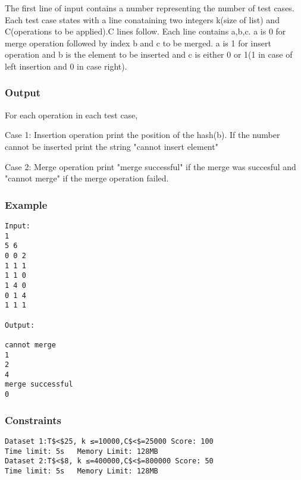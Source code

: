    The first line of input contains a number representing the number of test cases. Each test case states with a line conataining two integers k(size of list) and C(operations to be applied).C lines follow. Each line contains a,b,c. a is 0 for merge operation followed by index b and c to be merged. a is 1 for insert operation and b is the element to be inserted and c is either 0 or 1(1 in case of left insertion and 0 in case right).  

\subsubsection{   Output  }

   For each operation in each test case,  

   Case 1: Insertion operation print the position of the hash(b). If the number cannot be inserted print the string "cannot insert element"  

   Case 2: Merge operation print "merge successful" if the merge was succesful and "cannot merge" if the merge operation failed.  

\subsubsection{   Example  }
\begin{verbatim}
Input:
1
5 6
0 0 2
1 1 1
1 1 0
1 4 0
0 1 4
1 1 1 

Output:

cannot merge
1
2
4
merge successful
0
\end{verbatim}

\subsubsection{   Constraints  }
\begin{verbatim}
Dataset 1:T$<$25, k ≤=10000,C$<$=25000 Score: 100
Time limit: 5s   Memory Limit: 128MB
Dataset 2:T$<$8, k ≤=400000,C$<$=800000 Score: 50
Time limit: 5s   Memory Limit: 128MB 
\end{verbatim}